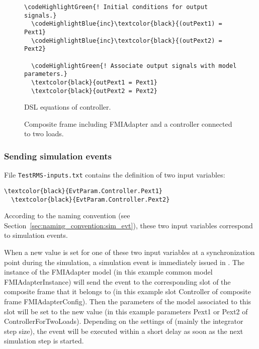 \begin{figure}[h!]
\vspace*{2em}
\begin{Verbatim}[frame=single,commandchars=\\\{\}]
  \codeHighlightGreen{! Initial conditions for output signals.}
  \codeHighlightBlue{inc}\textcolor{black}{(outPext1) = Pext1}
  \codeHighlightBlue{inc}\textcolor{black}{(outPext2) = Pext2}

  \codeHighlightGreen{! Associate output signals with model parameters.}
  \textcolor{black}{outPext1 = Pext1}
  \textcolor{black}{outPext2 = Pext2}
\end{Verbatim}
\vspace*{-2ex}
\caption{DSL equations of controller.}
\label{fig:controller_for_two_loads_equ}
\end{figure}


\begin{figure}[h!]
\vspace*{1em}
\caption{Composite frame including \dslmodel FMIAdapter and a controller connected to two loads.}
\label{fig:fmiadapterconfig_composite_frame_2}
\end{figure}

\clearpage

\subsubsection*{Sending simulation events}

File \texttt{TestRMS-inputs.txt} contains the definition of two input variables:
\begin{Verbatim}[frame=single,commandchars=\\\{\}]
  \textcolor{black}{EvtParam.Controller.Pext1}
  \textcolor{black}{EvtParam.Controller.Pext2}
\end{Verbatim}
According to the naming convention (see Section~\ref{sec:naming_convention:sim_evt}), these two input variables correspond to simulation events.

When a new value is set for one of these two input variables at a synchronization point during the simulation, a simulation event is immediately issued in \pf.
The instance of the FMIAdapter model (in this example common model FMIAdapterInstance) will send the event to the corresponding slot of the composite frame that it belongs to (in this example slot Controller of composite frame FMIAdapterConfig).
Then the parameters of the model associated to this slot will be set to the new value (in this example parameters Pext1 or Pext2 of \dslmodel ControllerForTwoLoads).
Depending on the settings of \pf (mainly the integrator step size), the event will be executed within a short delay as soon as the next simulation step is started.

